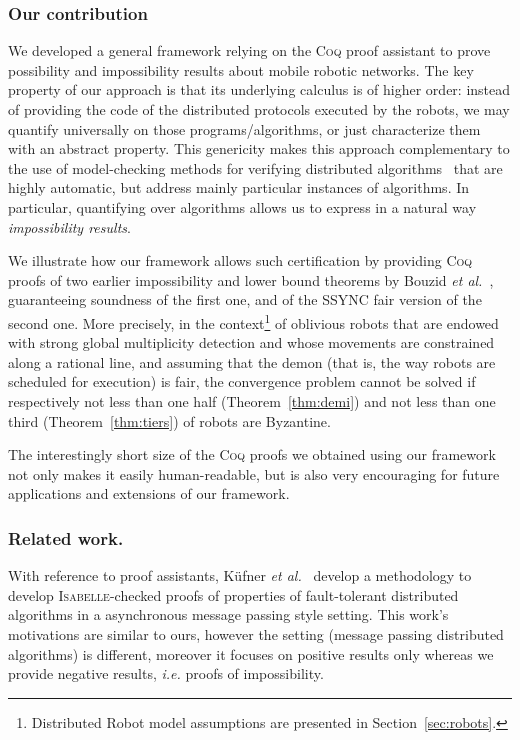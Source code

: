 \documentclass[11pt,a4]{llncs}
\newcommand{\x}{\xspace}
\newcommand{\coq}{\textsc{Coq}\x}
\begin{document}
\subsubsection*{Our contribution}

We developed a general framework relying on the \coq proof assistant
to prove possibility and impossibility results about mobile robotic
networks. 
The key property of our approach is that its underlying calculus is 
of higher order: instead of providing the code of the distributed
protocols executed by the robots, we may quantify universally on 
those programs/algorithms, or
just characterize them with an abstract property.
This genericity makes this approach complementary to the use of
model-checking methods for verifying distributed
algorithms~\cite{cadilhac06avocs,clement11icdcs,devismes12sss} that
are highly automatic, but address mainly particular instances of algorithms.
In particular, quantifying over algorithms allows us to express in a
natural way \emph{impossibility results}.

We illustrate how our framework allows such certification by
providing \coq proofs of two earlier impossibility and lower bound 
theorems by Bouzid \emph{et
  al.}~\cite{bouzid10tcs}, guaranteeing soundness of the first one,
and of the SSYNC fair version of the second one. More precisely, in the
context\footnote{Distributed Robot model assumptions are presented in Section~\ref{sec:robots}.} of oblivious robots that are endowed with strong global
multiplicity detection and whose movements are constrained along a
rational line, and assuming that the demon (that is, the way robots
are scheduled for execution) is fair, the
convergence problem cannot be solved if respectively not less than one
half (Theorem~\ref{thm:demi}) and not less than one third
(Theorem~\ref{thm:tiers}) of robots are Byzantine.

The interestingly short size of the \coq proofs we obtained using our
framework not only makes it easily human-readable, but is also very
encouraging for future applications and extensions of our framework.

\subsubsection*{Related work.}

With reference to proof assistants, K\"ufner \emph{et
al.}~\cite{kuefner12ifiptcs} develop a methodology to develop
\textsc{Isabelle}-checked proofs of properties of fault-tolerant
distributed algorithms in a asynchronous message passing style
setting. This work's motivations are similar to ours, however the
setting (message passing distributed algorithms) is different,
moreover it focuses on {positive} results only whereas we provide
{negative} results, \emph{i.e.} proofs of impossibility.
\end{document}
